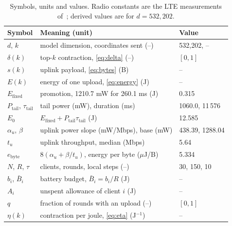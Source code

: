 \documentclass[conference,a4paper]{IEEEtran}
\newcommand{\Ez}{E_0}
\newcommand{\Bbar}{\bar{B}}
\begin{document}
\begin{table}[t]
\caption{Symbols, units and values. Radio constants are the LTE measurements of~\cite{huang2012}; derived values are for $d=532{,}202$.}
\label{tab:sym}
\centering
\setlength{\tabcolsep}{3pt}
\begin{tabular}{@{}lll@{}}
\toprule
Symbol & Meaning (unit) & Value\\
\midrule
$d$, $k$ & model dimension, coordinates sent (--) & 532{,}202, --\\
$\delta(k)$ & top-$k$ contraction, \eqref{eq:delta} (--) & $[0,1]$\\
$s(k)$ & uplink payload, \eqref{eq:bytes} (B) & --\\
$E(k)$ & energy of one upload, \eqref{eq:energy} (J) & --\\
$E_{\text{fixed}}$ & promotion, 1210.7 mW for 260.1 ms (J) & 0.315\\
$P_{\text{tail}}$, $\tau_{\text{tail}}$ & tail power (mW), duration (ms) & 1060.0, 11\,576\\
$\Ez$ & $E_{\text{fixed}}+P_{\text{tail}}\tau_{\text{tail}}$ (J) & 12.585\\
$\alpha_u$, $\beta$ & uplink power slope (mW/Mbps), base (mW) & 438.39, 1288.04\\
$t_u$ & uplink throughput, median (Mbps) & 5.64\\
$e_{\text{byte}}$ & $8(\alpha_u+\beta/t_u)$, energy per byte ($\mu$J/B) & 5.334\\
$N$, $R$, $\tau$ & clients, rounds, local steps (--) & 30, 150, 10\\
$b_i$, $\Bbar_i$ & battery budget, $\Bbar_i=b_i/R$ (J) & --\\
$A_i$ & unspent allowance of client $i$ (J) & --\\
$q$ & fraction of rounds with an upload (--) & $[0,1]$\\
$\eta(k)$ & contraction per joule, \eqref{eq:eta} (J$^{-1}$) & --\\
\bottomrule
\end{tabular}
\end{table}
\end{document}
